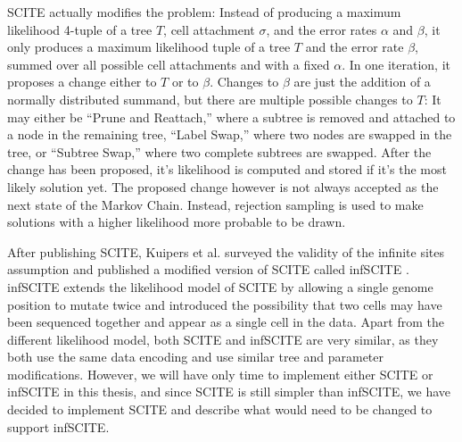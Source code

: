 \ac{SCITE} actually modifies the problem: Instead of producing a maximum likelihood 4-tuple of a tree $T$, cell attachment $\sigma$, and the error rates $\alpha$ and $\beta$, it only produces a maximum likelihood tuple of a tree $T$ and the error rate $\beta$, summed over all possible cell attachments and with a fixed $\alpha$. In one iteration, it proposes a change either to $T$ or to $\beta$. Changes to $\beta$ are just the addition of a normally distributed summand, but there are multiple possible changes to $T$: It may either be ``Prune and Reattach,'' where a subtree is removed and attached to a node in the remaining tree, ``Label Swap,'' where two nodes are swapped in the tree, or ``Subtree Swap,'' where two complete subtrees are swapped. After the change has been proposed, it's likelihood is computed and stored if it's the most likely solution yet. The proposed change however is not always accepted as the next state of the Markov Chain. Instead, rejection sampling is used to make solutions with a higher likelihood more probable to be drawn.

After publishing \ac{SCITE}, Kuipers et al. surveyed the validity of the infinite sites assumption and published a modified version of \ac{SCITE} called \ac{infSCITE} \cite{kuipers2017single}. \ac{infSCITE} extends the likelihood model of \ac{SCITE} by allowing a single genome position to mutate twice and introduced the possibility that two cells may have been sequenced together and appear as a single cell in the data. Apart from the different likelihood model, both \ac{SCITE} and \ac{infSCITE} are very similar, as they both use the same data encoding and use similar tree and parameter modifications. However, we will have only time to implement either \ac{SCITE} or \ac{infSCITE} in this thesis, and since \ac{SCITE} is still simpler than \ac{infSCITE}, we have decided to implement \ac{SCITE} and describe what would need to be changed to support \ac{infSCITE}.
